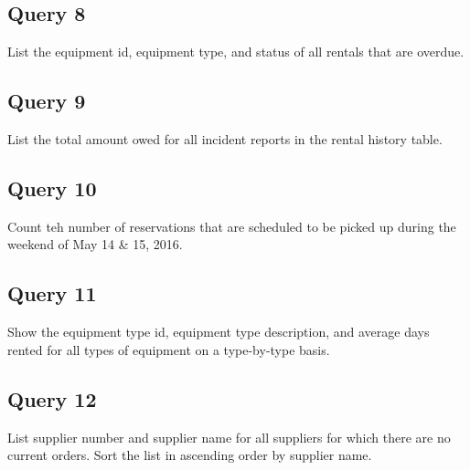 \documentclass[12pt]{article}
\begin{document}
\subsection*{Query 8}
List the equipment id, equipment type, and status of all rentals that are
overdue.

\subsection*{Query 9}
List the total amount owed for all incident reports in the rental history
table.

\subsection*{Query 10}
Count teh number of reservations that are scheduled to be picked up during the weekend of May 14 \& 15, 2016.

\subsection*{Query 11}
Show the equipment type id, equipment type description, and average days rented
for all types of equipment on a type-by-type basis.

\subsection*{Query 12}
List supplier number and supplier name for all suppliers for which there are no
current orders. Sort the list in ascending order by supplier name.

\end{document}
